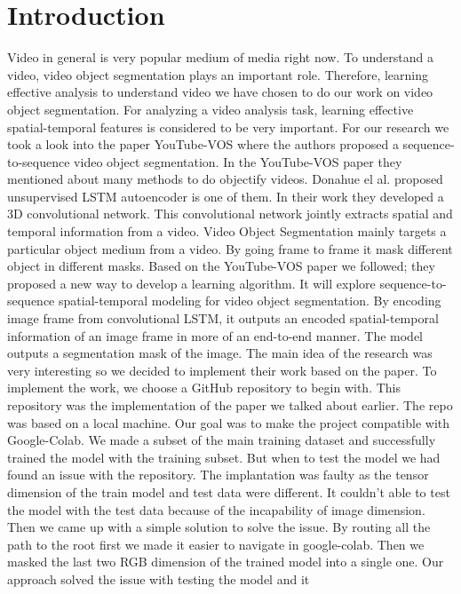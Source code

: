 \documentclass[conference]{IEEEtran}
\begin{document}
\section{Introduction}
Video in general is very popular medium of media right now. To understand a video, video object segmentation plays an important role. Therefore, learning effective analysis to understand video we have chosen to do our work on video object segmentation. For analyzing a video analysis task, learning effective spatial-temporal features is considered to be very important. For our research we took a look into the paper YouTube-VOS where the authors proposed a sequence-to-sequence video object segmentation\cite{xu2018youtube}.\newline
In the YouTube-VOS paper they mentioned about many methods to do objectify videos. Donahue el al.\cite{donahue2015long} proposed unsupervised LSTM autoencoder is one of them. In their work they developed a 3D convolutional network. This convolutional network jointly extracts spatial and temporal information from a video. Video Object Segmentation mainly targets a particular object medium from a video. By going frame to frame it mask different object in different masks.\newline
Based on the YouTube-VOS paper we followed; they proposed a new way to develop a learning algorithm. It will explore sequence-to-sequence spatial-temporal modeling for video object segmentation. By encoding image frame from convolutional LSTM\cite{shi2015convolutional}, it outputs an encoded spatial-temporal information of an image frame in more of an end-to-end manner. The model outputs a segmentation mask of the image. The main idea of the research was very interesting so we decided to implement their work based on the paper.
To implement the work, we choose a GitHub repository\cite{Vkt} to begin with. This repository was the implementation of the paper we talked about earlier. The repo was based on a local machine. Our goal was to make the project compatible with Google-Colab. We made a subset of the main training dataset and successfully trained the model with the training subset.
But when to test the model we had found an issue with the repository. The implantation was faulty as the tensor dimension of the train model and test data were different. It couldn’t able to test the model with the test data because of the incapability of image dimension. Then we came up with a simple solution to solve the issue. By routing all the path to the root first we made it easier to navigate in google-colab. Then we masked the last two RGB dimension of the trained model into a single one. Our approach solved the issue with testing the model and it 
\end{document}
